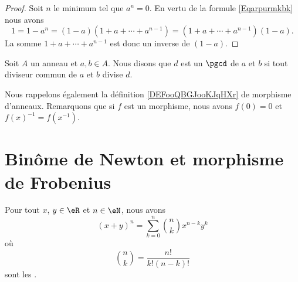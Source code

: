 \begin{proof}
    Soit \( n\) le minimum tel que \( a^n=0\). En vertu de la formule \eqref{Eqarpurmkbk} nous avons
    \begin{equation}
        1=1-a^n=(1-a)(1+a+\cdots+a^{n-1})=(1+a+\cdots+a^{n-1})(1-a).
    \end{equation}
    La somme \( 1+a+\cdots+a^{n-1}\) est donc un inverse de \( (1-a)\).
\end{proof}

\begin{definition}
    Soit \( A\) un anneau et \( a,b\in A\). Nous disons que \( d\) est un \( \pgcd\) de \( a\) et \( b\) si tout diviseur commun de \( a\) et \( b\) divise \( d\).
\end{definition}

Nous rappelons également la définition \ref{DEFooQBGJooKJqHXr} de morphisme d'anneaux. Remarquons que si \( f\) est un morphisme, nous avons \( f(0)=0\) et \( f(x)^{-1}=f(x^{-1})\).

\section{Binôme de Newton et morphisme de Frobenius}

\begin{proposition}     \label{PropBinomFExOiL}
Pour tout $x$, $y\in\eR$ et $n\in\eN$, nous avons
\begin{equation}        \label{EqNewtonB}
    (x+y)^n=\sum_{k=0}^n{n\choose k}x^{n-k}y^k
\end{equation}
où
\begin{equation}
    {n\choose k}=\frac{ n! }{ k!(n-k)! }
\end{equation}
sont les .
\end{proposition}

